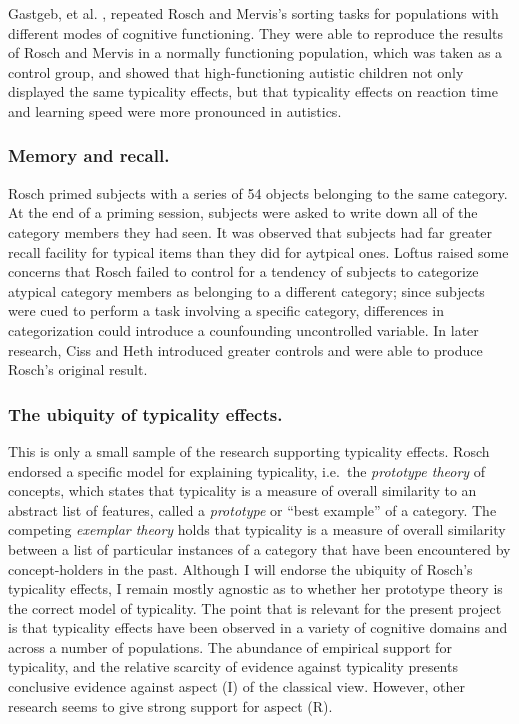 Gastgeb, et al. \cite{gastgeb_individuals_2006}, repeated Rosch and Mervis's sorting tasks for populations with different modes of cognitive functioning. They were able to reproduce the results of Rosch and Mervis in a normally functioning population, which was taken as a control group, and showed that high-functioning autistic children not only displayed the same typicality effects, but that typicality effects on reaction time and learning speed were more pronounced in autistics.

\subsubsection{Memory and recall.} Rosch \cite[Experiment 6]{rosch_cognitive_1975} primed  subjects with a series of 54 objects belonging to the same category. At the end of a priming session, subjects were asked to write down all of the category members they had seen. It was observed that subjects had far greater recall facility for typical items than they did for aytpical ones. Loftus  \cite{loftus_spreading_1975} raised some concerns that Rosch failed to control for a tendency of subjects to categorize atypical category members as belonging to a different category; since subjects were cued to perform a task involving a specific category, differences in categorization could introduce a counfounding uncontrolled variable. In later research, Ciss and Heth \cite{cisse_evaluation_1989} introduced greater controls and were able to produce Rosch's original result.

\subsubsection{The ubiquity of typicality effects.} This is only a small sample of the research supporting typicality effects. Rosch endorsed a specific model for explaining typicality, i.e.\ the \emph{prototype theory} of concepts, which states that typicality is a measure of overall similarity to an abstract list of features, called a \emph{prototype} or ``best example'' of a category. The competing \emph{exemplar theory} holds that typicality is a measure of overall similarity between a list of particular instances of a category that have been encountered by concept-holders in the past. Although I will endorse the ubiquity of Rosch's typicality effects, I remain mostly agnostic as to whether her prototype theory is the correct model of typicality. The point that is relevant for the present project is that typicality effects have been observed in a variety of cognitive domains and across a number of populations. The abundance of empirical support for typicality, and the relative scarcity of evidence against typicality presents conclusive evidence against aspect (I) of the classical view. However, other research seems to give strong support for aspect (R).


